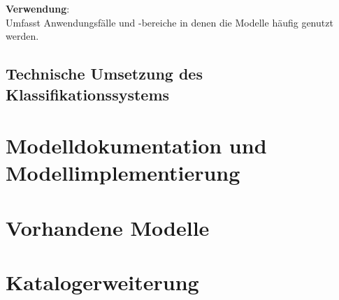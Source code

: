 \textbf{Verwendung}: \\
Umfasst Anwendungsfälle und -bereiche in denen die Modelle häufig genutzt werden.

\subsection{Technische Umsetzung des Klassifikationssystems}
\label{Ch:Ergebnisse:Sec:KS:SubSec:TechUmsetzung}

\section{Modelldokumentation und Modellimplementierung}
\label{Ch:Ergebnisse:Sec:Dok+Implementierung}

\section{Vorhandene Modelle}
\label{Ch:Ergebnisse:Sec:Modelle}

\section{Katalogerweiterung}
\label{Ch:Ergebnisse:Sec:Erweiterung}



